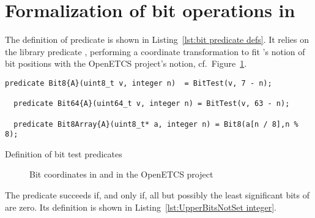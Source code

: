 \FloatBarrier

\section{Formalization of bit operations in \framac}
\label{sec:bit operations in framac}






The definition of predicate  is shown in 
Listing~\ref{lst:bit predicate defs}.
%
It relies on the \framac library predicate ,
performing a coordinate
transformation to fit \framac's notion of bit positions with the
OpenETCS project's
notion, cf.\ Figure~\ref{fig:bit coords}.





\begin{listing}[hbt]
\begin{minipage}{0.99\textwidth}
\begin{lstlisting}[style=acsl-block]
  predicate Bit8{A}(uint8_t v, integer n)  = BitTest(v, 7 - n);

  predicate Bit64{A}(uint64_t v, integer n) = BitTest(v, 63 - n);

  predicate Bit8Array{A}(uint8_t* a, integer n) = Bit8(a[n / 8],n % 8);
\end{lstlisting}
\end{minipage}
\caption{\label{lst:bit predicate defs}Definition of bit test predicates}
\end{listing}













\begin{figure}
\begin{center}
\vspace*{2cm}
\vspace*{2cm}
\caption{\label{fig:bit coords}
        Bit coordinates in \framac and in the OpenETCS project}
\end{center}
\end{figure}

\FloatBarrier






The predicate  succeeds if,
and only if,
all but possibly 
the least significant  bits of  are zero.
%
Its definition is shown in Listing~\ref{lst:UpperBitsNotSet integer}.







